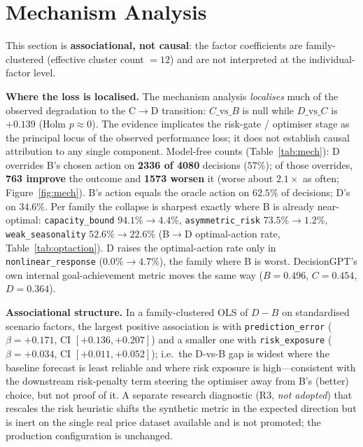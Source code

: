 \documentclass[conference]{IEEEtran}
\newcommand{\code}[1]{\texttt{#1}}
\newcommand{\dvb}{\ensuremath{D\!-\!B}}
\begin{document}
\section{Mechanism Analysis}\label{sec:mech}
This section is \textbf{associational, not causal}: the factor coefficients are
family-clustered (effective cluster count $=12$) and are not interpreted at the
individual-factor level.

\textbf{Where the loss is localised.} The mechanism analysis \emph{localises}
much of the observed degradation to the C$\to$D transition: $C\text{\_vs\_}B$ is
null while $D\text{\_vs\_}C$ is $+0.139$ (Holm $p\approx0$). The evidence
implicates the risk-gate / optimiser stage as the principal locus of the
observed performance loss; it does not establish causal attribution to any
single component. Model-free counts (Table~\ref{tab:mech}): D overrides B's
chosen action on \textbf{2336 of 4080} decisions ($57\%$); of those overrides,
\textbf{763 improve} the outcome and \textbf{1573 worsen} it (worse about
$2.1\times$ as often; Figure~\ref{fig:mech}). B's action equals the oracle
action on $62.5\%$ of decisions; D's on $34.6\%$. Per family the collapse is
sharpest exactly where B is already near-optimal:
\code{capacity\_bound} $94.1\%\!\to\!4.4\%$,
\code{asymmetric\_risk} $73.5\%\!\to\!1.2\%$,
\code{weak\_seasonality} $52.6\%\!\to\!22.6\%$ (B$\to$D optimal-action rate,
Table~\ref{tab:optaction}). D raises the optimal-action rate only in
\code{nonlinear\_response} ($0.0\%\!\to\!4.7\%$), the family where B is worst.
DecisionGPT's own internal goal-achievement metric moves the same way
($B=0.496$, $C=0.454$, $D=0.364$).

\textbf{Associational structure.} In a family-clustered OLS of $\dvb$ on
standardised scenario factors, the largest positive association is with
\code{prediction\_error} ($\beta=+0.171$, CI $[+0.136,+0.207]$) and a smaller
one with \code{risk\_exposure} ($\beta=+0.034$, CI $[+0.011,+0.052]$); i.e.\ the
D-vs-B gap is widest where the baseline forecast is least reliable and where risk
exposure is high---consistent with the downstream risk-penalty term steering the
optimiser away from B's (better) choice, but not proof of it. A separate
research diagnostic (R3, \emph{not adopted}) that rescales the risk heuristic
shifts the synthetic metric in the expected direction but is inert on the single
real price dataset available and is not promoted; the production configuration is
unchanged.
\end{document}
